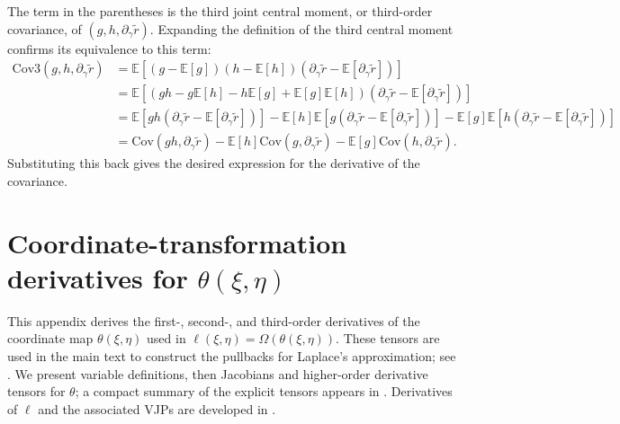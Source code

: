 \documentclass{article}
\begin{document}
%
The term in the parentheses is the third joint central moment, or third-order covariance, of $(g, h, \partial_{\gamma} \tilde{r})$.
Expanding the definition of the third central moment confirms its equivalence to this term:
%
\begin{align}
  \mathrm{Cov3}(g, h, \partial_{\gamma} \tilde{r}) & = \mathbb{E}[(g-\mathbb{E}[g])(h-\mathbb{E}[h])(\partial_{\gamma} \tilde{r}-\mathbb{E}[\partial_{\gamma} \tilde{r}])]                                                                                                                                                                           \\
                                                   & = \mathbb{E}[(gh - g\mathbb{E}[h] - h\mathbb{E}[g] + \mathbb{E}[g]\mathbb{E}[h])(\partial_{\gamma} \tilde{r} - \mathbb{E}[\partial_{\gamma} \tilde{r}])]                                                                                                                                        \\
                                                   & = \mathbb{E}[gh(\partial_{\gamma} \tilde{r} - \mathbb{E}[\partial_{\gamma} \tilde{r}])] - \mathbb{E}[h]\mathbb{E}[g(\partial_{\gamma} \tilde{r} - \mathbb{E}[\partial_{\gamma} \tilde{r}])] - \mathbb{E}[g]\mathbb{E}[h(\partial_{\gamma} \tilde{r} - \mathbb{E}[\partial_{\gamma} \tilde{r}])] \\
                                                   & = \mathrm{Cov}(gh, \partial_{\gamma} \tilde{r}) - \mathbb{E}[h]\mathrm{Cov}(g, \partial_{\gamma} \tilde{r}) - \mathbb{E}[g]\mathrm{Cov}(h, \partial_{\gamma} \tilde{r}).
\end{align}
%
Substituting this back gives the desired expression for the derivative of the covariance.

\section{Coordinate-transformation derivatives for $\theta(\xi,\eta)$}\label{app:theta-derivatives}

This appendix derives the first-, second-, and third-order derivatives of the coordinate map $\theta(\xi,\eta)$ used in $\ell(\xi,\eta) = \Omega(\theta(\xi,\eta))$.
These tensors are used in the main text to construct the pullbacks for Laplace's approximation; see .
We present variable definitions, then Jacobians and higher-order derivative tensors for $\theta$; a compact summary of the explicit tensors appears in .
Derivatives of $\ell$ and the associated VJPs are developed in .
\end{document}
